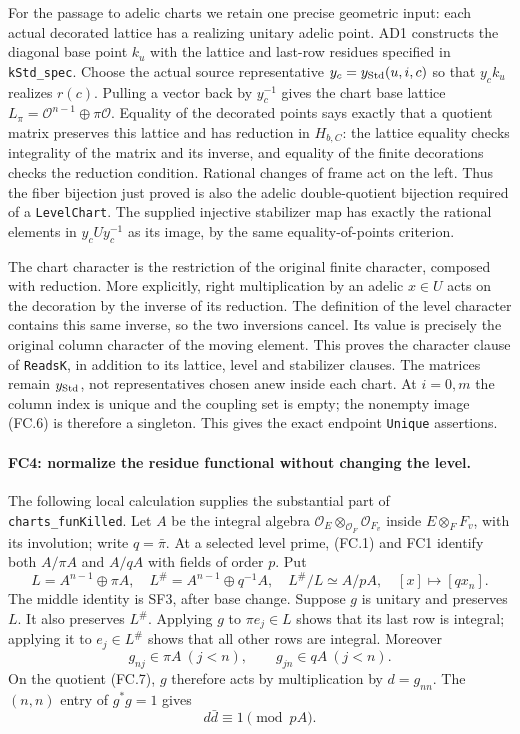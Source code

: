 For the passage to adelic charts we retain one precise geometric input:
each actual decorated lattice has a realizing unitary adelic point.
AD1 constructs the diagonal base point $k_u$ with the lattice and
last-row residues specified in \texttt{kStd\_spec}. Choose the actual source representative
$y_c=y_{\rm Std}(u,i,c)$ so that $y_ck_u$ realizes $r(c)$.
Pulling a vector back by $y_c^{-1}$ gives the chart base lattice
$L_\pi=\mathcal O^{n-1}\oplus\pi\mathcal O$. Equality of the
decorated points says exactly that a quotient matrix preserves this
lattice and has reduction in $H_{b,C}$: the lattice equality checks
integrality of the matrix and its inverse, and equality of the finite
decorations checks the reduction condition. Rational changes of frame
act on the left. Thus the fiber bijection just proved is also the
adelic double-quotient bijection required of a \texttt{LevelChart}.
The supplied injective stabilizer map has exactly the rational elements
in $y_cUy_c^{-1}$ as its image, by the same equality-of-points criterion.

The chart character is the restriction of the original finite character,
composed with reduction. More explicitly, right multiplication by an
adelic $x\in U$ acts on the decoration by the inverse of its reduction.
The definition of the level character contains this same inverse, so
the two inversions cancel. Its value is precisely the original column
character of the moving element. This proves the character clause of
\texttt{ReadsK}, in addition to its lattice, level and stabilizer clauses.
The matrices remain $y_{\rm Std}$, not representatives chosen anew
inside each chart. At $i=0,m$ the column index is unique and the coupling
set is empty; the nonempty image (FC.6) is therefore a singleton.
This gives the exact endpoint \texttt{Unique} assertions.

\paragraph{FC4: normalize the residue functional without changing the
level.}
The following local calculation supplies the substantial part of
\texttt{charts\_funKilled}. Let $A$ be the integral algebra
$\mathcal O_E\otimes_{\mathcal O_F}\mathcal O_{F_v}$ inside
$E\otimes_FF_v$, with its involution; write $q=\bar\pi$.
At a selected level prime, (FC.1) and FC1 identify both $A/\pi A$
and $A/qA$ with fields of order $p$. Put
\[
 L=A^{n-1}\oplus\pi A,\quad
 L^\#=A^{n-1}\oplus q^{-1}A,\quad
 L^\#/L\simeq A/pA,\quad [x]\longmapsto[qx_n].         \tag{FC.7}
\]
The middle identity is SF3, after base change. Suppose $g$ is unitary
and preserves $L$. It also preserves $L^\#$. Applying $g$ to
$\pi e_j\in L$ shows that its last row is integral; applying it to
$e_j\in L^\#$ shows that all other rows are integral. Moreover
\[
 g_{nj}\in\pi A\ (j<n),\qquad
 g_{jn}\in qA\ (j<n).                                 \tag{FC.8}
\]
On the quotient (FC.7), $g$ therefore acts by multiplication by
$d=g_{nn}$. The $(n,n)$ entry of $g^*g=1$ gives
\[
 d\bar d\equiv1\pmod{pA}.                             \tag{FC.9}
\]

